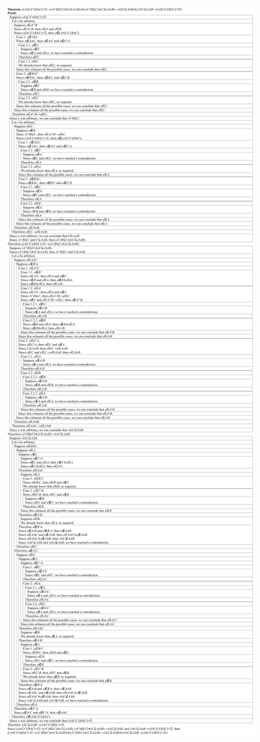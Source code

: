 \documentclass{article}
\begin{document}
\includegraphics[width=\textwidth,height=\textheight,keepaspectratio]{3_7_3}
\end{document}

